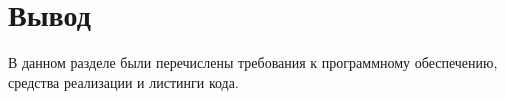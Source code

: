 %
%
%
%
%
%
%
%
%
%
%
%
%
%

\section*{Вывод}

В данном разделе были перечислены требования к программному обеспечению, средства реализации и листинги кода.

    